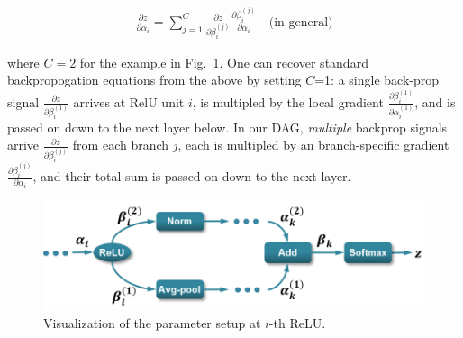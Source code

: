 \documentclass[10pt,twocolumn,letterpaper]{article}
\begin{document}
\begin{align}
\frac{\partial z}{\partial \alpha_i}=\sum_{j=1}^{C}\frac{\partial z}{\partial \beta_i^{(j)}}\frac{\partial \beta_i^{(j)}}{\partial \alpha_i} \quad \text {(in general)} \label{eq:backprop1}
\end{align}

\noindent where $C=2$ for the example in Fig.~\ref{fig:backprop_eq}. One can recover standard backpropogation equations from the above by setting $C$=1: a single back-prop signal $\frac{\partial z}{\partial \beta_i^{(1)}}$  arrives at RelU unit $i$, is multipled by the local gradient $\frac{\partial \beta_i^{(1)}}{\partial \alpha_i^{(1)}}$, and is passed on down to the next layer below. In our DAG, {\em multiple} backprop signals arrive $\frac{\partial z}{\partial \beta_i^{(j)}}$ from each branch $j$, each is multipled by an branch-specific gradient $\frac{\partial \beta_i^{(j)}}{\partial \alpha_i}$, and their total sum is passed on down to the next layer.


\begin{figure}[htbp]
\centering
	\includegraphics[width=\columnwidth]{fig/fig_backprop_eq.png}
\caption{Visualization of the parameter setup at $i$-th ReLU.}

\label{fig:backprop_eq}
\end{figure}
\end{document}
